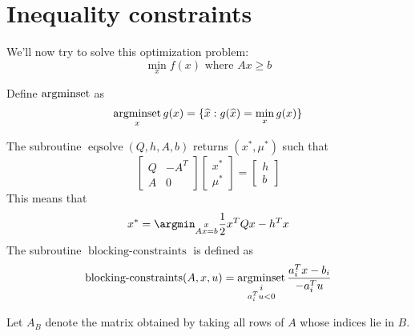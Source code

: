 \section{Inequality constraints}

We'll now try to solve this optimization problem:
\[ \min_x f(x) \textrm{ where } Ax \ge b \]

Define $\operatorname*{argminset}$ as
\[ \operatorname*{argminset}_x g(x) = \{\widehat{x}: g(\widehat{x}) = \min_x g(x) \} \]

The subroutine $\operatorname{eqsolve}(Q, h, A, b)$ returns $(x^*, \mu^*)$ such that
\[ \begin{bmatrix} Q & -A^T \\ A & 0 \end{bmatrix}
\begin{bmatrix} x^* \\ \mu^* \end{bmatrix}
= \begin{bmatrix} h \\ b \end{bmatrix} \]
This means that
\[ x^* = \argmin_{\substack{x \\ Ax = b}} \frac{1}{2}x^TQx - h^Tx \]
The subroutine $\operatorname{blocking-constraints}$ is defined as
\[ \operatorname{blocking-constraints}(A, x, u) =
\operatorname*{argminset}_{\substack{i \\ a_i^Tu < 0}}\frac{a_i^Tx - b_i}{-a_i^Tu} \]

\newcommand*{\CondExpr}[3]{#1 \textrm{ if } #2 \textrm{ else } #3}

Let $A_B$ denote the matrix obtained by taking all rows of $A$
whose indices lie in $B$.

